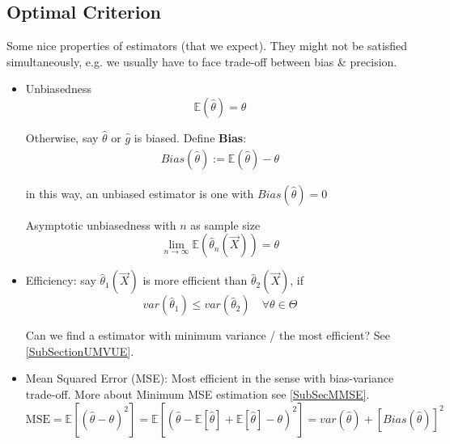 \subsection{Optimal Criterion}\label{SubSectionOptimalCriterion}
        Some nice properties of estimators (that we expect). They might not be satisfied simultaneously, e.g. we usually have to face trade-off between bias \& precision.
    \begin{itemize}
        \item Unbiasedness
        \begin{equation}
            \mathbb{E}(\hat{\theta})=\theta
        \end{equation}

        Otherwise, say $\hat{\theta}$ or $\hat{g}$ is biased. Define \textbf{Bias}:
        \begin{align}
            Bias(\hat{\theta }):= \mathbb{E}(\hat{\theta})-\theta
        \end{align}
        
        in this way, an unbiased estimator is one with $ Bias(\hat{\theta })=0 $

        Asymptotic unbiasedness with $ n $ as sample size
        \begin{equation}
            \lim_{n\to\infty}  \mathbb{E}(\hat{\theta }_n(\vec{X})) =\theta 
        \end{equation}
        \item Efficiency: say $\hat{\theta }_1(\vec{X})$ is more efficient than $\hat{\theta }_2(\vec{X})$, if
        \begin{equation}
            var(\hat{\theta }_1)\leq var(\hat{\theta }_2)  \quad\forall\theta\in\Theta  
        \end{equation}

        Can we find a estimator with minimum variance / the most efficient? See \autoref{SubSectionUMVUE}.
        \item Mean Squared Error (MSE): Most efficient in the sense with bias-variance trade-off. More about Minimum MSE estimation see \autoref{SubSecMMSE}.
        \begin{equation}\label{EqaMSEExpansion}
            \text{MSE}=\mathbb{E}[(\hat{\theta}-\theta)^2]=\mathbb{E}\left[ (\hat{\theta }-\mathbb{E}\left[ \hat{\theta}  \right] +\mathbb{E}\left[ \hat{\theta } \right]-\theta  )^2 \right] =var(\hat{\theta})+[Bias(\hat{\theta})]^2
        \end{equation}


\end{itemize}
